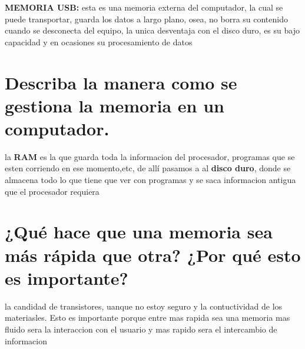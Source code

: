 \documentclass{article}
\begin{document}
\textbf{MEMORIA USB: } esta es una memoria externa del computador, la cual se puede transportar, guarda los datos a largo plano, osea, no borra su contenido cuando se desconecta del equipo, la unica desventaja con el disco duro, es su bajo capacidad y en ocasiones su procesamiento de datos 

\section{Describa la manera como se gestiona la memoria en un computador.}

la \textbf{RAM} es la que guarda toda la informacion del procesador, programas que se esten corriendo en ese momento,etc, de allí pasamos a al \textbf{disco duro}, donde se almacena todo lo que tiene que ver con programas y se saca informacion antigua que el procesador requiera 

\section{¿Qué hace que una memoria sea más rápida que otra? ¿Por qué esto es importante?}

la candidad de transistores, uanque no estoy seguro y la contuctividad de los materiasles. Esto es importante porque entre mas rapida sea una memoria mas fluido sera la interaccion con el usuario y mas rapido sera el intercambio de informacion 
\end{document}

